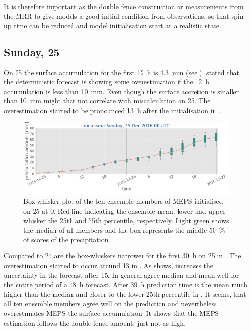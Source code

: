 \\
It is therefore important as the double fence construction or measurements from the MRR to give models a good initial condition from observations, so that spin-up time can be reduced and model initialisation start at a realistic state.

\subsection{Sunday, \SI{25}{\dec}}\label{sec:2512:surface}
On \SI{25}{\dec} the surface accumulation for the first \SI{12}{\hour} is \SI{4.3}{\mm} (see ). \cite{muller_arome-metcoop:_2017} stated that the deterministic forecast is showing some overestimation if the \SI{12}{\hour} accumulation is less than \SI{10}{\mm}. Even though the surface accretion is smaller than \SI{10}{\mm} might that not correlate with miscalculation on \SI{25}{\dec}. The overestimation started to be pronounced \SI{13}{\hour} after the initialisation in .
%
\begin{figure}[t]
	\includegraphics[width=\textwidth]{./fig_boxplot_sfc/20161225_0}
	\caption{Box-whisker-plot of the ten ensemble members of MEPS initialised on \SI{25}{\dec} at \SI{0}{\UTC}. Red line indicating the ensemble mean, lower and upper whisker the 25th and 75th percentile, respectively. Light green shows the median of all members and the box represents the middle \SI{50}{\percent} of scores of the precipitation.}\label{fig:boxplt25}
\end{figure}
%
Compared to \SI{24}{\dec} are the box-whiskers narrower for the first \SI{30}{\hour} on \SI{25}{\dec} in . The overestimation started to occur around \SI{13}{\UTC} in . As  shows, increases the uncertainty in the forecast after \SI{15}{\UTC}. In general agree median and mean well for the entire period of a \SI{48}{\hour} forecast. After \SI{39}{\hour} prediction time is the mean much higher than the median and closer to the lower 25th percentile in . It seems, that all ten ensemble members agree well on the prediction and nevertheless overestimates MEPS the surface accumulation. It shows that the MEPS estimation follows the double fence amount, just not as high. 
